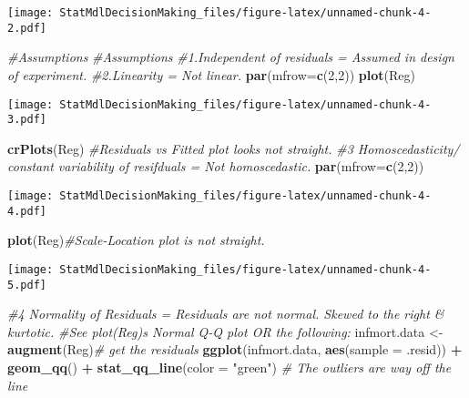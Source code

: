 \documentclass[
]{article}
\newenvironment{Shaded}{\begin{snugshade}}{\end{snugshade}}
\newcommand{\AttributeTok}[1]{\textcolor[rgb]{0.13,0.29,0.53}{#1}}
\newcommand{\CommentTok}[1]{\textcolor[rgb]{0.56,0.35,0.01}{\textit{#1}}}
\newcommand{\DecValTok}[1]{\textcolor[rgb]{0.00,0.00,0.81}{#1}}
\newcommand{\FunctionTok}[1]{\textcolor[rgb]{0.13,0.29,0.53}{\textbf{#1}}}
\newcommand{\NormalTok}[1]{#1}
\newcommand{\OtherTok}[1]{\textcolor[rgb]{0.56,0.35,0.01}{#1}}
\newcommand{\SpecialCharTok}[1]{\textcolor[rgb]{0.81,0.36,0.00}{\textbf{#1}}}
\newcommand{\StringTok}[1]{\textcolor[rgb]{0.31,0.60,0.02}{#1}}
\begin{document}
\texttt{[image: StatMdlDecisionMaking\_files/figure-latex/unnamed-chunk-4-2.pdf]}

\begin{Shaded}
\begin{Highlighting}[]
  \CommentTok{\#Assumptions}
    \CommentTok{\#Assumptions}
    \CommentTok{\#1.Independent of residuals = Assumed in design of experiment. }
    \CommentTok{\#2.Linearity = Not linear.}
      \FunctionTok{par}\NormalTok{(}\AttributeTok{mfrow=}\FunctionTok{c}\NormalTok{(}\DecValTok{2}\NormalTok{,}\DecValTok{2}\NormalTok{))}
      \FunctionTok{plot}\NormalTok{(Reg)}
\end{Highlighting}
\end{Shaded}

\texttt{[image: StatMdlDecisionMaking\_files/figure-latex/unnamed-chunk-4-3.pdf]}

\begin{Shaded}
\begin{Highlighting}[]
      \FunctionTok{crPlots}\NormalTok{(Reg) }\CommentTok{\#Residuals vs Fitted plot looks not straight.}
    \CommentTok{\#3 Homoscedasticity/ constant variability of resifduals = Not homoscedastic.}
      \FunctionTok{par}\NormalTok{(}\AttributeTok{mfrow=}\FunctionTok{c}\NormalTok{(}\DecValTok{2}\NormalTok{,}\DecValTok{2}\NormalTok{))}
\end{Highlighting}
\end{Shaded}

\texttt{[image: StatMdlDecisionMaking\_files/figure-latex/unnamed-chunk-4-4.pdf]}

\begin{Shaded}
\begin{Highlighting}[]
      \FunctionTok{plot}\NormalTok{(Reg)}\CommentTok{\#Scale{-}Location plot is not straight.}
\end{Highlighting}
\end{Shaded}

\texttt{[image: StatMdlDecisionMaking\_files/figure-latex/unnamed-chunk-4-5.pdf]}

\begin{Shaded}
\begin{Highlighting}[]
    \CommentTok{\#4 Normality of Residuals = Residuals are not normal. Skewed to the right \& kurtotic.}
      \CommentTok{\#See plot(Reg)\textquotesingle{}s Normal Q{-}Q plot OR the following: }
\NormalTok{      infmort.data }\OtherTok{\textless{}{-}} \FunctionTok{augment}\NormalTok{(Reg)}\CommentTok{\# get the residuals}
      \FunctionTok{ggplot}\NormalTok{(infmort.data, }\FunctionTok{aes}\NormalTok{(}\AttributeTok{sample =}\NormalTok{ .resid)) }\SpecialCharTok{+}
\FunctionTok{geom\_qq}\NormalTok{() }\SpecialCharTok{+}
\FunctionTok{stat\_qq\_line}\NormalTok{(}\AttributeTok{color =} \StringTok{"green"}\NormalTok{) }\CommentTok{\# The outliers are way off the line}
\end{Highlighting}
\end{Shaded}
\end{document}
